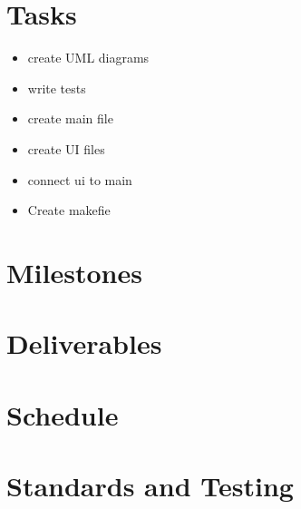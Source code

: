 \documentclass{article}
\begin{document}
  \section{Tasks}
  \begin{itemize}
    \item{create UML diagrams}
    \item{write tests}
    \item{create main file}
    \item{create UI files}
    \item{connect ui to main}
    \item{Create makefie}
  \end{itemize}
  \section{Milestones}
  \section{Deliverables}
  \section{Schedule}
  \section{Standards and Testing}
\end{document}
